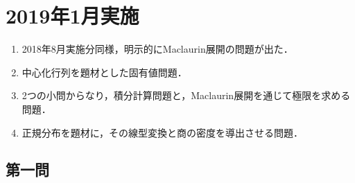 \documentclass[uplatex,dvipdfmx]{jsarticle}
\begin{document}
\section{2019年1月実施}

\begin{tcolorbox}[colframe=ForestGreen, colback=ForestGreen!10!white,breakable,colbacktitle=ForestGreen!40!white,coltitle=black,fonttitle=\bfseries\sffamily,
    title=概観]
    \begin{enumerate}[{第}1{問}]
        \item 2018年8月実施分同様，明示的にMaclaurin展開の問題が出た．
        \item 中心化行列を題材とした固有値問題．
        \item 2つの小問からなり，積分計算問題と，Maclaurin展開を通じて極限を求める問題．
        \item 正規分布を題材に，その線型変換と商の密度を導出させる問題．
    \end{enumerate}
\end{tcolorbox}

\subsection{第一問}
\end{document}

